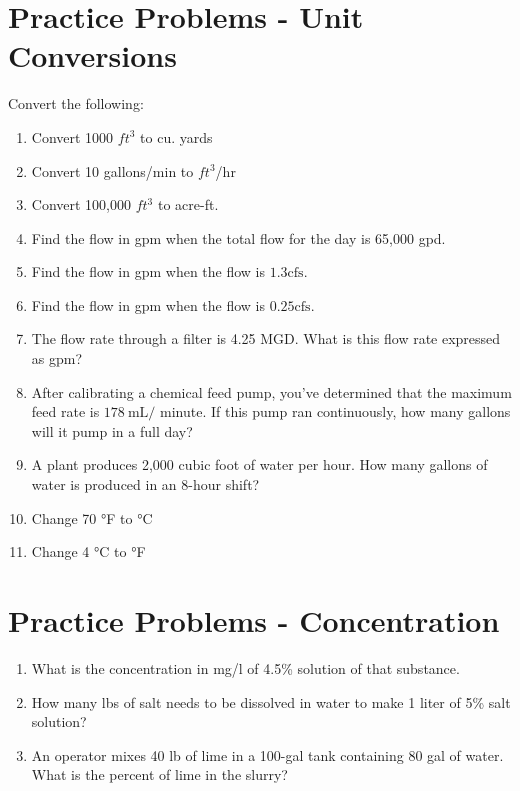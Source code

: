 \section*{Practice Problems - Unit Conversions}
Convert the following:\\
\begin{enumerate}
\item Convert 1000 $ft^3$ to cu. yards\\

\item Convert 10 gallons/min to $ft^3$/hr\\

\item Convert 100,000 $ft^3$ to acre-ft.\\

\item Find the flow in gpm when the total flow for the day is 65,000 gpd.

\item Find the flow in gpm when the flow is $1.3 \mathrm{cfs}$.

\item Find the flow in gpm when the flow is $0.25 \mathrm{cfs}$.

\item The flow rate through a filter is 4.25 MGD. What is this flow rate expressed as gpm?\\

\item After calibrating a chemical feed pump, you've determined that the maximum feed rate is $178 \mathrm{~mL} /$ minute. If this pump ran continuously, how many gallons will it pump in a full day?

\item A plant produces 2,000 cubic foot of water per hour. How many gallons of water is produced in an 8-hour shift?

\item Change 70 °F to °C

\item Change 4 °C to °F
\end{enumerate}


\section*{Practice Problems - Concentration}
\begin{enumerate}
\item What is the concentration in mg/l of  4.5\% solution of that substance.\\
\item How many lbs of salt needs to be dissolved in water to make 1 liter of 5\% salt solution?\\
\item An operator mixes 40 lb of lime in a 100-gal tank containing 80 gal of water. What is the percent of lime in the slurry?

\end{enumerate}

